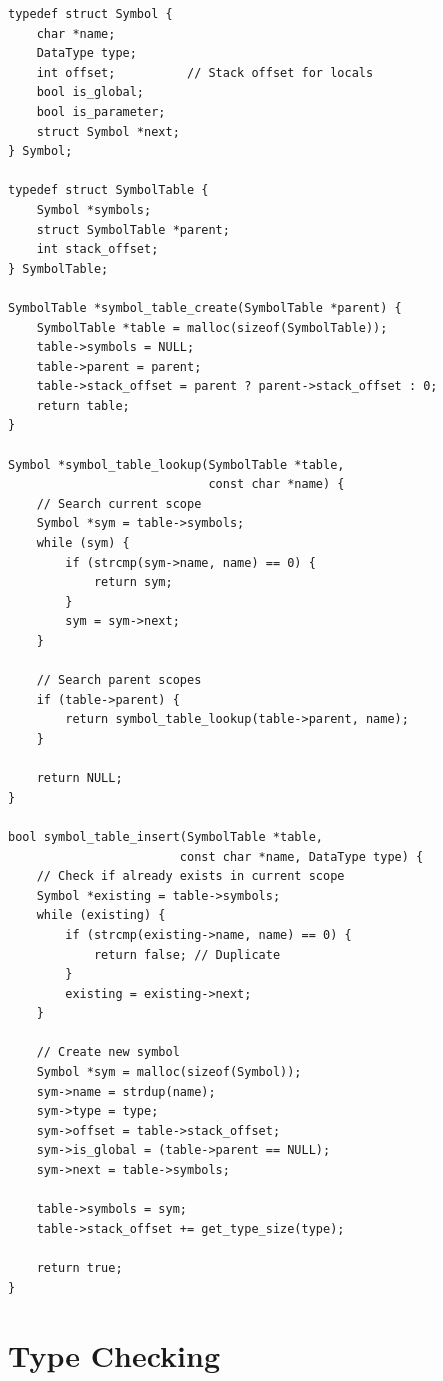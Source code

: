 \documentclass[12pt,a4paper,oneside]{book}
\begin{document}
\begin{lstlisting}[style=c, caption={Symbol Table Implementation}]
typedef struct Symbol {
    char *name;
    DataType type;
    int offset;          // Stack offset for locals
    bool is_global;
    bool is_parameter;
    struct Symbol *next;
} Symbol;

typedef struct SymbolTable {
    Symbol *symbols;
    struct SymbolTable *parent;
    int stack_offset;
} SymbolTable;

SymbolTable *symbol_table_create(SymbolTable *parent) {
    SymbolTable *table = malloc(sizeof(SymbolTable));
    table->symbols = NULL;
    table->parent = parent;
    table->stack_offset = parent ? parent->stack_offset : 0;
    return table;
}

Symbol *symbol_table_lookup(SymbolTable *table, 
                            const char *name) {
    // Search current scope
    Symbol *sym = table->symbols;
    while (sym) {
        if (strcmp(sym->name, name) == 0) {
            return sym;
        }
        sym = sym->next;
    }
    
    // Search parent scopes
    if (table->parent) {
        return symbol_table_lookup(table->parent, name);
    }
    
    return NULL;
}

bool symbol_table_insert(SymbolTable *table, 
                        const char *name, DataType type) {
    // Check if already exists in current scope
    Symbol *existing = table->symbols;
    while (existing) {
        if (strcmp(existing->name, name) == 0) {
            return false; // Duplicate
        }
        existing = existing->next;
    }
    
    // Create new symbol
    Symbol *sym = malloc(sizeof(Symbol));
    sym->name = strdup(name);
    sym->type = type;
    sym->offset = table->stack_offset;
    sym->is_global = (table->parent == NULL);
    sym->next = table->symbols;
    
    table->symbols = sym;
    table->stack_offset += get_type_size(type);
    
    return true;
}
\end{lstlisting}

\section{Type Checking}
\end{document}
